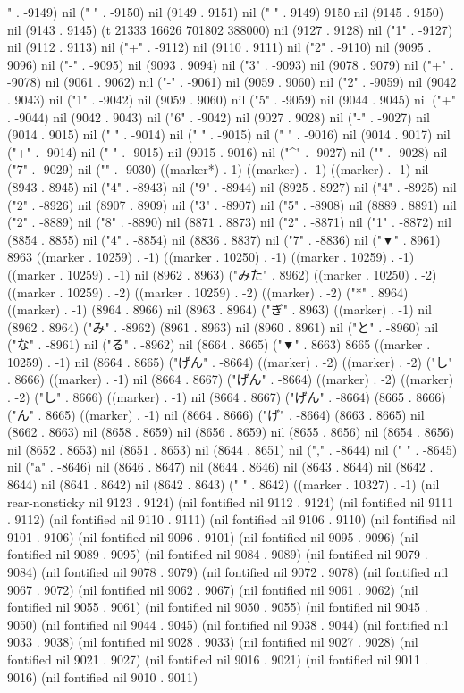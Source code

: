 {{" . -9149) nil (" " . -9150) nil (9149 . 9151) nil (" " . 9149) 9150 nil (9145 . 9150) nil (9143 . 9145) (t 21333 16626 701802 388000) nil (9127 . 9128) nil ("1" . -9127) nil (9112 . 9113) nil ("+" . -9112) nil (9110 . 9111) nil ("2" . -9110) nil (9095 . 9096) nil ("-" . -9095) nil (9093 . 9094) nil ("3" . -9093) nil (9078 . 9079) nil ("+" . -9078) nil (9061 . 9062) nil ("-" . -9061) nil (9059 . 9060) nil ("2" . -9059) nil (9042 . 9043) nil ("1" . -9042) nil (9059 . 9060) nil ("5" . -9059) nil (9044 . 9045) nil ("+" . -9044) nil (9042 . 9043) nil ("6" . -9042) nil (9027 . 9028) nil ("-" . -9027) nil (9014 . 9015) nil ("
" . -9014) nil (" " . -9015) nil (" " . -9016) nil (9014 . 9017) nil ("+" . -9014) nil ("-" . -9015) nil (9015 . 9016) nil ("^" . -9027) nil ("{" . -9028) nil ("7" . -9029) nil ("}" . -9030) ((marker*) . 1) ((marker) . -1) ((marker) . -1) nil (8943 . 8945) nil ("4" . -8943) nil ("9" . -8944) nil (8925 . 8927) nil ("4" . -8925) nil ("2" . -8926) nil (8907 . 8909) nil ("3" . -8907) nil ("5" . -8908) nil (8889 . 8891) nil ("2" . -8889) nil ("8" . -8890) nil (8871 . 8873) nil ("2" . -8871) nil ("1" . -8872) nil (8854 . 8855) nil ("4" . -8854) nil (8836 . 8837) nil ("7" . -8836) nil ("▼" . 8961) 8963 ((marker . 10259) . -1) ((marker . 10250) . -1) ((marker . 10259) . -1) ((marker . 10259) . -1) nil (8962 . 8963) ("みた" . 8962) ((marker . 10250) . -2) ((marker . 10259) . -2) ((marker . 10259) . -2) ((marker) . -2) ("*" . 8964) ((marker) . -1) (8964 . 8966) nil (8963 . 8964) ("ぎ" . 8963) ((marker) . -1) nil (8962 . 8964) ("み" . -8962) (8961 . 8963) nil (8960 . 8961) nil ("と" . -8960) nil ("な" . -8961) nil ("る" . -8962) nil (8664 . 8665) ("▼" . 8663) 8665 ((marker . 10259) . -1) nil (8664 . 8665) ("げん" . -8664) ((marker) . -2) ((marker) . -2) ("し" . 8666) ((marker) . -1) nil (8664 . 8667) ("げん" . -8664) ((marker) . -2) ((marker) . -2) ("し" . 8666) ((marker) . -1) nil (8664 . 8667) ("げん" . -8664) (8665 . 8666) ("ん" . 8665) ((marker) . -1) nil (8664 . 8666) ("げ" . -8664) (8663 . 8665) nil (8662 . 8663) nil (8658 . 8659) nil (8656 . 8659) nil (8655 . 8656) nil (8654 . 8656) nil (8652 . 8653) nil (8651 . 8653) nil (8644 . 8651) nil ("," . -8644) nil (" " . -8645) nil ("a" . -8646) nil (8646 . 8647) nil (8644 . 8646) nil (8643 . 8644) nil (8642 . 8644) nil (8641 . 8642) nil (8642 . 8643) ("  " . 8642) ((marker . 10327) . -1) (nil rear-nonsticky nil 9123 . 9124) (nil fontified nil 9112 . 9124) (nil fontified nil 9111 . 9112) (nil fontified nil 9110 . 9111) (nil fontified nil 9106 . 9110) (nil fontified nil 9101 . 9106) (nil fontified nil 9096 . 9101) (nil fontified nil 9095 . 9096) (nil fontified nil 9089 . 9095) (nil fontified nil 9084 . 9089) (nil fontified nil 9079 . 9084) (nil fontified nil 9078 . 9079) (nil fontified nil 9072 . 9078) (nil fontified nil 9067 . 9072) (nil fontified nil 9062 . 9067) (nil fontified nil 9061 . 9062) (nil fontified nil 9055 . 9061) (nil fontified nil 9050 . 9055) (nil fontified nil 9045 . 9050) (nil fontified nil 9044 . 9045) (nil fontified nil 9038 . 9044) (nil fontified nil 9033 . 9038) (nil fontified nil 9028 . 9033) (nil fontified nil 9027 . 9028) (nil fontified nil 9021 . 9027) (nil fontified nil 9016 . 9021) (nil fontified nil 9011 . 9016) (nil fontified nil 9010 . 9011) }}
